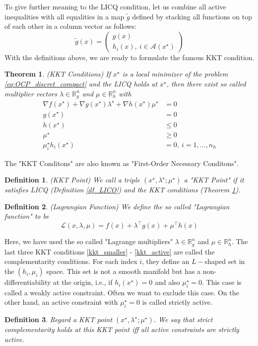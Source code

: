 \documentclass  [
  paper    = a4,
  BCOR     = 10mm,
  twoside,
  fontsize = 12pt,
  fleqn,
  toc      = bibnumbered,
  toc      = listofnumbered,
  numbers  = noendperiod,
  headings = normal,
  listof   = leveldown,
  version  = 3.03
]                                       {scrreprt}
\newcommand{\<}{\langle}
\renewcommand{\>}{\rangle}
\newtheorem{theorem}{Theorem}
\newtheorem{definition}{Definition}
\begin{document}
To give further meaning to the LICQ condition, let us combine all active inequalities with all equalities in a map $\tilde{g}$ defined by stacking all functions on top of each other in a column vector as follows:
\begin{equation}
	\tilde{g}(x) =  \begin{pmatrix} g(x) \\ h_i(x), \ i \in \mathcal{A}(x^\star)    \end{pmatrix}
\end{equation}
With the definitions above, we are ready to formulate the famous KKT condition. 
\begin{theorem}(KKT Conditions)
	If $x^\star$ is a local minimizer of the problem \ref{eq:OCP_discret_compact} and the LICQ holds at $x^\star$, then there exist
	so called multiplier vectors $\lambda \in \mathbb{R}^n_g$ and $\mu \in \mathbb{R}^n_h$ with 
	\begin{subequations}
		\begin{align}
			\nabla f(x^\star) + \nabla g(x^\star) \lambda^\star +  \nabla h(x^\star) \mu^\star &= 0 \\
			g(x^\star)	 &= 0   \\
			h(x^\star)	&\leq 0  \label{kkt_smaller}\\
			\mu^\star & \geq 0 \\
			\mu_i^\star  h_i(x^\star) &=0 , \  i = 1, ..., n_h \label{kkt_active}
		\end{align}
	\end{subequations}
	\label{TH_KKT}
\end{theorem}
The "KKT Conditons" are also known as "First-Order Necessary Conditons". 

\begin{definition}(KKT Point)
	We call a triple $(x^\star, \lambda^\star; \mu^\star)$ a "KKT Point" if it satisfies LICQ  (Definition \ref{df_LICO}) and the KKT conditions (Theorem \ref{TH_KKT}).
\end{definition}
\begin{definition}(Lagrangian Function)
	We define the so called "Lagrangian function" to be
	\begin{equation}
		\mathcal{L}(x,\lambda, \mu) = f(x) + \lambda^\top g(x) +  \mu^\top h(x) 
		\label{eq_Lagrangian}
	\end{equation}
\end{definition}
Here, we have used the so called "Lagrange multipliers" $\lambda \in \mathbb{R}^n_g$ and $\mu \in \mathbb{R}^n_h$. 
The last three KKT conditions \ref{kkt_smaller} - \ref{kkt_active} are called the complementarity conditions. For each index $i$, they define an $L-$shaped set in the $(h_i, \mu_i)$ space. This set is not a smooth manifold but has a non-differentiability at the origin, i.e., if  $h_i(x^\star)=0$ and also $\mu_i^\star = 0$. This case is called a weakly active constraint. Often we want to exclude this case. On the other hand, an active constraint with $\mu_i^\star = 0$ is called strictly active.
\begin{definition}
	Regard a KKT point $(x^\star, \lambda^\star; \mu^\star)$. We say that strict complementarity holds at this KKT point iff all	active constraints are strictly active.
\end{definition}
\end{document}
